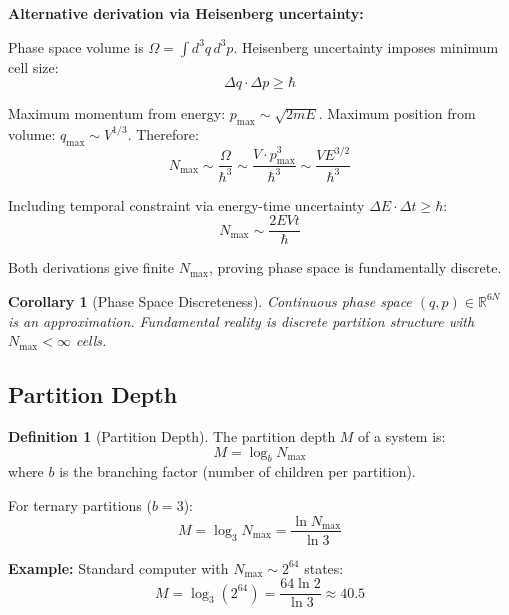 \documentclass[twocolumn,10pt]{article}
\newtheorem{corollary}[theorem]{Corollary}
\theoremstyle{definition}
\newtheorem{definition}[theorem]{Definition}
\theoremstyle{remark}
\newcommand{\Nmax}{N_{\max}}
\begin{document}
\vspace{0.2cm}
\noindent\textbf{Alternative derivation via Heisenberg uncertainty:}

Phase space volume is $\Omega = \int d^3q \, d^3p$. Heisenberg uncertainty\cite{heisenberg1927} imposes minimum cell size:
\begin{equation}
\Delta q \cdot \Delta p \geq \hbar
\end{equation}

Maximum momentum from energy: $p_{\max} \sim \sqrt{2mE}$. Maximum position from volume: $q_{\max} \sim V^{1/3}$. Therefore:
\begin{equation}
\Nmax \sim \frac{\Omega}{\hbar^3} \sim \frac{V \cdot p_{\max}^3}{\hbar^3} \sim \frac{VE^{3/2}}{\hbar^3}
\end{equation}

Including temporal constraint via energy-time uncertainty $\Delta E \cdot \Delta t \geq \hbar$:
\begin{equation}
\Nmax \sim \frac{2EVt}{\hbar}
\end{equation}

Both derivations give finite $\Nmax$, proving phase space is fundamentally discrete.

\begin{corollary}[Phase Space Discreteness]
\label{cor:discrete}
Continuous phase space $(q,p) \in \mathbb{R}^{6N}$ is an approximation. Fundamental reality is discrete partition structure with $\Nmax < \infty$ cells.
\end{corollary}

\subsection{Partition Depth}

\begin{definition}[Partition Depth]
\label{def:partition_depth}
The partition depth $M$ of a system is:
\begin{equation}
M = \log_b \Nmax
\end{equation}
where $b$ is the branching factor (number of children per partition).
\end{definition}

\noindent For ternary partitions ($b=3$):
\begin{equation}
M = \log_3 \Nmax = \frac{\ln \Nmax}{\ln 3}
\end{equation}

\textbf{Example:} Standard computer with $\Nmax \sim 2^{64}$ states:
\begin{equation}
M = \log_3(2^{64}) = \frac{64 \ln 2}{\ln 3} \approx 40.5
\end{equation}
\end{document}

